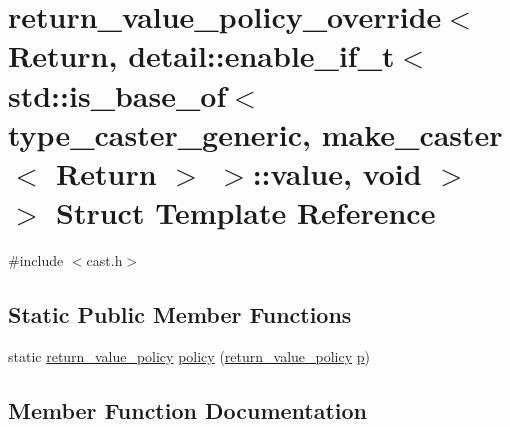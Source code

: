 \hypertarget{structreturn__value__policy__override_3_01_return_00_01detail_1_1enable__if__t_3_01std_1_1is__badbc5555ea30d1cff9fa4aef329884809}{}\section{return\+\_\+value\+\_\+policy\+\_\+override$<$ Return, detail\+::enable\+\_\+if\+\_\+t$<$ std\+::is\+\_\+base\+\_\+of$<$ type\+\_\+caster\+\_\+generic, make\+\_\+caster$<$ Return $>$ $>$\+::value, void $>$ $>$ Struct Template Reference}
\label{structreturn__value__policy__override_3_01_return_00_01detail_1_1enable__if__t_3_01std_1_1is__badbc5555ea30d1cff9fa4aef329884809}


{\ttfamily \#include $<$cast.\+h$>$}

\subsection*{Static Public Member Functions}
\begin{DoxyCompactItemize}
\item 
static \mbox{\hyperlink{detail_2common_8h_adde72ab1fb0dd4b48a5232c349a53841}{return\+\_\+value\+\_\+policy}} \mbox{\hyperlink{structreturn__value__policy__override_3_01_return_00_01detail_1_1enable__if__t_3_01std_1_1is__badbc5555ea30d1cff9fa4aef329884809_a45d371705994c7e9247681bad4f3f3f9}{policy}} (\mbox{\hyperlink{detail_2common_8h_adde72ab1fb0dd4b48a5232c349a53841}{return\+\_\+value\+\_\+policy}} \mbox{\hyperlink{_s_d_l__opengl__glext_8h_aa5367c14d90f462230c2611b81b41d23}{p}})
\end{DoxyCompactItemize}


\subsection{Member Function Documentation}
\mbox{\label{structreturn__value__policy__override_3_01_return_00_01detail_1_1enable__if__t_3_01std_1_1is__badbc5555ea30d1cff9fa4aef329884809_a45d371705994c7e9247681bad4f3f3f9}} 
